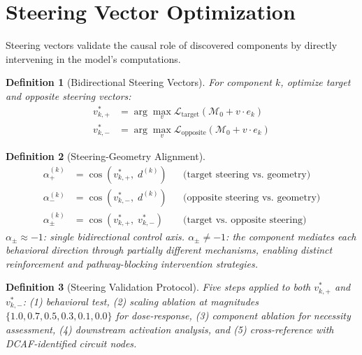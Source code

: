 \documentclass[11pt]{article}
\newtheorem{definition}{Definition}[section]
\begin{document}
\section{Steering Vector Optimization}
\label{sec:steering}

Steering vectors validate the causal role of discovered components by directly intervening in the model's computations.

\begin{definition}[Bidirectional Steering Vectors]
For component $k$, optimize target and opposite steering vectors:
\begin{align}
v^*_{k,+} &= \arg\max_v \mathcal{L}_{\text{target}}(\mathcal{M}_0 + v \cdot e_k) \\
v^*_{k,-} &= \arg\max_v \mathcal{L}_{\text{opposite}}(\mathcal{M}_0 + v \cdot e_k)
\end{align}
\end{definition}

\begin{definition}[Steering-Geometry Alignment]
\begin{align}
\alpha^{(k)}_+ &= \cos(v^*_{k,+},\; d^{(k)}) & &\text{(target steering vs.\ geometry)} \\
\alpha^{(k)}_- &= \cos(v^*_{k,-},\; d^{(k)}) & &\text{(opposite steering vs.\ geometry)} \\
\alpha^{(k)}_\pm &= \cos(v^*_{k,+},\; v^*_{k,-}) & &\text{(target vs.\ opposite steering)}
\end{align}
$\alpha_\pm \approx -1$: single bidirectional control axis. $\alpha_\pm \neq -1$: the component mediates each behavioral direction through partially different mechanisms, enabling distinct reinforcement and pathway-blocking intervention strategies.
\end{definition}

\begin{definition}[Steering Validation Protocol]
Five steps applied to both $v^*_{k,+}$ and $v^*_{k,-}$: (1) behavioral test, (2) scaling ablation at magnitudes $\{1.0, 0.7, 0.5, 0.3, 0.1, 0.0\}$ for dose-response, (3) component ablation for necessity assessment, (4) downstream activation analysis, and (5) cross-reference with DCAF-identified circuit nodes.
\end{definition}


\end{document}
